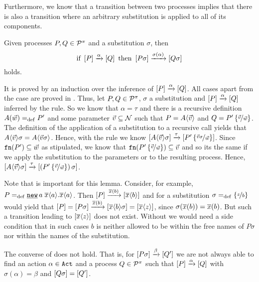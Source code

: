 Furthermore, we know that a transition between two processes implies that there is also a transition where an arbitrary substitution is applied to all of its components.

\begin{lemma}
\label{lem_subst_trans_partI}
Given processes $P,Q\in\mathcal P^{\pi}$ and a substitution $\sigma$, then
	\[\text{if }\left[P\right]\xrightarrow{\alpha}\left[Q\right]\text{ then }\left[P\sigma{}\right]\xrightarrow{\sigma(\alpha)}\left[Q\sigma{}\right]\]
holds.
\end{lemma}
\begin{prf}
It is proved by an induction over the inference of $\left[P\right]\xrightarrow{\alpha}\left[Q\right]$. All cases apart from the \ecall{} case are proved in \cite{sangiorgi}. Thus, let $P,Q\in\mathcal P^{\pi}$, $\sigma$ a substitution and $\left[P\right]\xrightarrow{\alpha}\left[Q\right]$ inferred by the \ecall{} rule. So we know that $\alpha=\tau$ and there is a recursive definition $A(\vec{w})=_{\mathrm{def}}{}P'$ and some parameter $\vec{v}\subseteq\mathcal N$ such that $P=A\langle\vec{v}\rangle$ and $Q=P'\left\{\nicefrac{\vec{v}}{\vec{w}}\right\}$. The definition of the application of a substitution to a recursive call yields that $A\langle\vec{v}\rangle\sigma=A\langle\vec{v}\sigma\rangle$. Hence, with the \ecall{} rule we know $\left[A\langle\vec{v}\rangle\sigma\right]\xrightarrow{\tau}\left[P'\left\{\nicefrac{\vec{v}\sigma}{\vec{w}}\right\}\right]$. Since $\mathtt{fn}(P')\subseteq{}\vec{w}$ as stipulated, we know that $\mathtt{fn}(P'\left\{\nicefrac{\vec{v}}{\vec{w}}\right\})\subseteq{}\vec{v}$ and so its the same if we apply the substitution to the parameters or to the resulting process. Hence, $\left[A\langle\vec{v}\rangle\sigma\right]\xrightarrow{\tau}\left[\left(P'\left\{\nicefrac{\vec{v}}{\vec{w}}\right\}\right)\sigma\right]$.
\end{prf}

Note that  is important for this lemma. Consider, for example, $P\define\procres{a}{\out{x}{a}.\out{x}{a}}$. Then $\left[P\right]\xrightarrow{\overline{x}(b)}\left[\overline{x}\langle b\rangle\right]$ and for a substitution $\sigma=_{\mathrm{def}}\left\{\nicefrac{z}{b}\right\}$  would yield that $\left[P\right]=\left[P\sigma\right]\xrightarrow{\overline{x}(b)}\left[\overline{x}\langle b\rangle\sigma\right]=\left[\overline{x}\langle z\rangle\right]$, since $\sigma(\overline{x}(b))=\overline{x}(b)$. But such a transition leading to $\left[\overline{x}\langle z\rangle\right]$ does not exist. Without  we would need a side condition that in such cases $b$ is neither allowed to be within the free names of $P\sigma$ nor within the names of the substitution.

The converse of  does not hold. That is, for $\left[P\sigma\right]\xrightarrow{\beta}\left[Q'\right]$ we are not always able to find an action $\alpha\in\mathtt{Act}$ and a process $Q\in\mathcal P^{\pi}$ such that $\left[P\right]\xrightarrow{\alpha}\left[Q\right]$ with $\sigma(\alpha)=\beta$ and $\left[Q\sigma\right]=\left[Q'\right]$.

